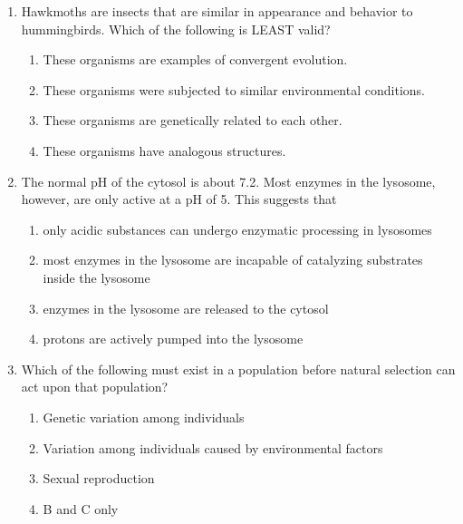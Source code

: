 \documentclass[12pt]{article}
\begin{document}
\begin{enumerate}[label=\arabic*.]
\begin{enumerate}[label=(\alph*)]
    \item Not enough information is provided to determine if the frequency of the allele will remain the same or change.
    \item The frequency of the allele will remain at 0.3 because the population is at Hardy-Weinberg equilibrium.
    \item The frequency of the allele will remain the same; this is an example of the bottleneck effect.
\end{enumerate}
\item Hawkmoths are insects that are similar in appearance and behavior to hummingbirds. Which of the following is LEAST valid?
\begin{enumerate}[label=(\alph*)]
    \item These organisms are examples of convergent evolution.
    \item These organisms were subjected to similar environmental conditions.
    \item These organisms are genetically related to each other.
    \item These organisms have analogous structures.
\end{enumerate}
\item The normal pH of the cytosol is about 7.2. Most enzymes in the lysosome, however, are only active at a pH of 5. This suggests that
\begin{enumerate}[label=(\alph*)]
    \item only acidic substances can undergo enzymatic processing in lysosomes
    \item most enzymes in the lysosome are incapable of catalyzing substrates inside the lysosome
    \item enzymes in the lysosome are released to the cytosol
    \item protons are actively pumped into the lysosome
\end{enumerate}
\item Which of the following must exist in a population before natural selection can act upon that population?
\begin{enumerate}[label=(\alph*)]
    \item Genetic variation among individuals
    \item Variation among individuals caused by environmental factors
    \item Sexual reproduction
    \item B and C only
\end{enumerate}

\end{enumerate}
\end{document}
